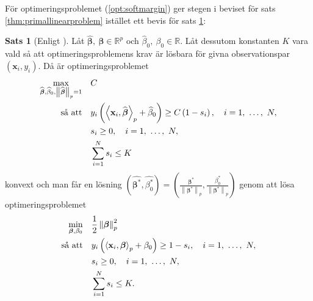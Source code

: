 \documentclass[a4paper, 12pt]{report}
\theoremstyle{definition}
\newtheorem{thm}{Sats}[section]
\newtheorem{cor}[thm]{Korollarium}
\theoremstyle{remark}
\newcommand{\bfbeta}{{\boldsymbol{\beta}}}
\newcommand{\bfx}{\mathbf{x}}
\newcommand{\llangle}{\left\langle}
\newcommand{\rrangle}{\right\rangle}
\newcommand{\inner}[2]{\llangle #1, #2 \rrangle}
\begin{document}
För optimeringsproblemet (\ref{opt:softmargin}) ger stegen i beviset för sats \ref{thm:primallinearproblem} istället ett bevis för sats \ref{thm:primalsoftmargin}:
\begin{thm}[Enligt \cite{ESL}]\label{thm:primalsoftmargin}
	Låt $\widehat{\bfbeta},~\bfbeta \in \mathbb{R}^p$ och $\widehat{\beta}_0,~\beta_0 \in \mathbb{R}$. Låt dessutom konstanten $K$ vara vald så att optimeringsproblemens krav är lösbara för givna observationspar $\left(\mathbf{x}_i, y_i\right)$. Då är optimeringsproblemet
	\begin{equation*}
	\begin{aligned}
	\operatornamewithlimits{max}_{\widehat{\bfbeta}, \widehat{\beta}_0, \left\|\widehat{\bfbeta}
\right\|_p=1} & & &C\\
	\text{så att} & & &y_i\left(\inner{\bfx_i}{\widehat{\bfbeta}}_p+\widehat{\beta}_0\right)\geq C\left(1-s_i\right),\quad i=1,~\dots,~N,\\
	& & &s_i\geq0,\quad i=1,~\dots,~N,\\
	& & &\sum_{i=1}^{N}s_i \leq K
	\end{aligned}
	\end{equation*}
	konvext och man får en lösning $\left(\widehat{\bfbeta^*},  \widehat{\beta^*_0}\right)=\left(\frac{\bfbeta^*}{\left\|\bfbeta^*\right\|_p}, \frac{\beta^*_0}{\left\|\bfbeta^*\right\|_p}\right)$ genom att lösa optimeringsproblemet
	\begin{equation*}
	\begin{aligned}
	\operatornamewithlimits{min}_{\bfbeta, \beta_0} & & &\frac{1}{2}\left\|\bfbeta
\right\|_p^2\\
	\text{så att} & & &y_i\left(\inner{\bfx_i}{\bfbeta}_p+\beta_0\right)\geq 1 - s_i,\quad i=1,~\dots,~N,\\
	& & &s_i\geq0,\quad i=1,~\dots,~N,\\
	& & &\sum_{i=1}^{N} s_i \leq K.
	\end{aligned}
	\end{equation*}
\end{thm}

\end{document}
